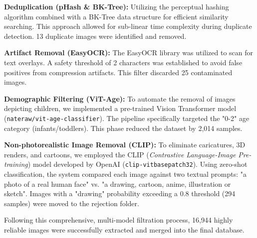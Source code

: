 \documentclass{article}
\begin{document}
\begin{itemize}
    \item \textbf{Deduplication (pHash \& BK-Tree):} Utilizing the perceptual hashing algorithm combined with a BK-Tree data structure for efficient similarity searching. This approach allowed for sub-linear time complexity during duplicate detection. 13 duplicate images were identified and removed.
    
    \item \textbf{Artifact Removal (EasyOCR):} The EasyOCR library was utilized to scan for text overlays. A safety threshold of 2 characters was established to avoid false positives from compression artifacts. This filter discarded 25 contaminated images.
    
    \item \textbf{Demographic Filtering (ViT-Age):} To automate the removal of images depicting children, we implemented a pre-trained Vision Transformer model (\texttt{nateraw/vit-age-classifier}). The pipeline specifically targeted the "0-2" age category (infants/toddlers). This phase reduced the dataset by 2,014 samples.
    
\begin{sloppypar}
\item \textbf{Non-photorealistic Image Removal (CLIP):} To eliminate caricatures, 3D renders, and cartoons, we employed the CLIP (\textit{Contrastive Language-Image Pre-training}) model developed by OpenAI (\texttt{clip-vit\-base\-patch32}). Using zero-shot classification, the system compared each image against two textual prompts: "a photo of a real human face" vs. "a drawing, cartoon, anime, illustration or sketch". Images with a "drawing" probability exceeding a 0.8 threshold (294 samples) were moved to the rejection folder.
\end{sloppypar}
\end{itemize}

Following this comprehensive, multi-model filtration process, 16,944 highly reliable images were successfully extracted and merged into the final database.
\end{document}
